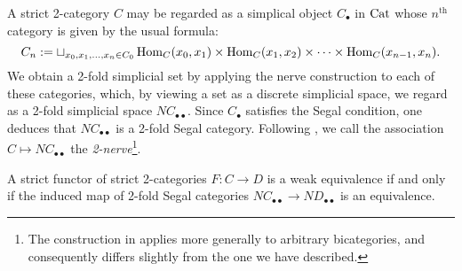 \documentclass{amsart}
\begin{document}
\begin{example}
	A strict 2-category $C$ may be regarded as a simplical object $C_\bullet$ in $\mathrm{Cat}$ whose $n^\textrm{th}$ category is given by the usual formula:
	\begin{equation*}
		C_n := \sqcup_{x_0, x_1, \dots, x_n \in C_0} \operatorname{Hom}_C(x_0, x_1) \times \operatorname{Hom}_C(x_1, x_2) \times \cdots \times \operatorname{Hom}_C(x_{n-1}, x_n).
	\end{equation*}
	We obtain a 2-fold simplicial set by applying the nerve construction to each of these categories, which, by viewing a set as a discrete simplicial space, we regard as a 2-fold simplicial space $NC_{\bullet \bullet}$. Since $C_\bullet$ satisfies the Segal condition, one deduces that $NC_{\bullet \bullet}$ is a 2-fold Segal category. 
Following \cite{MR2366560}, we call the association $C \mapsto NC_{\bullet \bullet}$ the {\em 2-nerve}\footnote{The construction in \cite{MR2366560} applies more generally to arbitrary bicategories, and consequently differs slightly from the one we have described.}.  
\end{example}

\begin{lemma}[\cite{MR2366560}] \label{lma:2catnervereflectsequiv}
	A strict functor of strict 2-categories $F: C \to D$ is a weak equivalence if and only if the induced map of 2-fold Segal categories $NC_{\bullet \bullet} \to ND_{\bullet \bullet}$ is an equivalence. 
\end{lemma}
\end{document}
